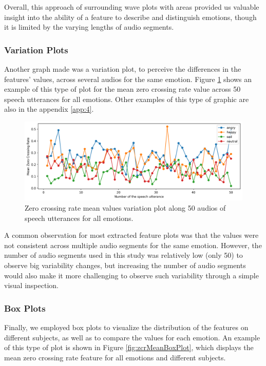 Overall, this approach of surrounding wave plots with areas provided us valuable insight into the ability of a feature to describe and distinguish emotions, though it is limited by the varying lengths of audio segments.

\subsubsection{Variation Plots}

Another graph made was a variation plot, to perceive the differences in the features' values, across several audios for the same emotion. Figure \ref{fig:zcrMeanVar} shows an example of this type of plot for the mean zero crossing rate value across 50 speech utterances for all emotions. Other examples of this type of graphic are also in the appendix \ref{app:4}.

\begin{figure}[H]
	\centering
	\includegraphics[width=\linewidth]{figs/4_1_traditional/meanZCRVar.png}
	\caption{Zero crossing rate mean values variation plot along 50 audios of speech utterances for all emotions.}
	\label{fig:zcrMeanVar}
\end{figure}

A common observation for most extracted feature plots was that the values were not consistent across multiple audio segments for the same emotion. However, the number of audio segments used in this study was relatively low (only 50) to observe big variability changes, but increasing the number of audio segments would also make it more challenging to observe such variability through a simple visual inspection.

\subsubsection{Box Plots}

Finally, we employed box plots to visualize the distribution of the features on different subjects, as well as to compare the values for each emotion. An example of this type of plot is shown in Figure \ref{fig:zcrMeanBoxPlot}, which displays the mean zero crossing rate feature for all emotions and different subjects. 


